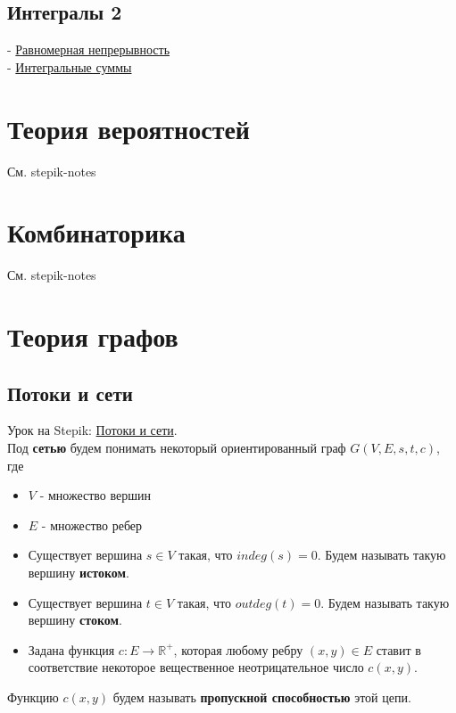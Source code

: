 \documentclass{article}
\begin{document}
\subsection{Интегралы 2}

- \href{https://stepik.org/lesson/35886/step/2}{Равномерная непрерывность} \\
- \href{https://stepik.org/lesson/28384/step/1}{Интегральные суммы}

\section{Теория вероятностей}

См. stepik-notes

\section{Комбинаторика}

См. stepik-notes

\section{Теория графов}

\subsection{Потоки и сети}

Урок на Stepik: \href{https://stepik.org/lesson/36127/step/10?unit=44097}{Потоки и сети}. \\

Под \textbf{сетью} будем понимать некоторый ориентированный граф $G(V, E, s, t, c)$, где

\begin{itemize}
	\item $V$ - множество вершин
	\item $E$ - множество ребер
	\item Существует вершина $s \in V$ такая, что $indeg(s) = 0$. Будем называть такую вершину \textbf{истоком}.
	\item Существует вершина $t \in V$ такая, что $outdeg(t) = 0$. Будем называть такую вершину \textbf{стоком}.
	\item Задана функция $c: E \to \mathbb{R^+}$, которая любому ребру $(x, y) \in E$ ставит в соответствие некоторое вещественное неотрицательное число $c(x, y)$. 
\end{itemize}

Функцию $c(x, y)$ будем называть \textbf{пропускной способностью} этой цепи. \\
\end{document}
